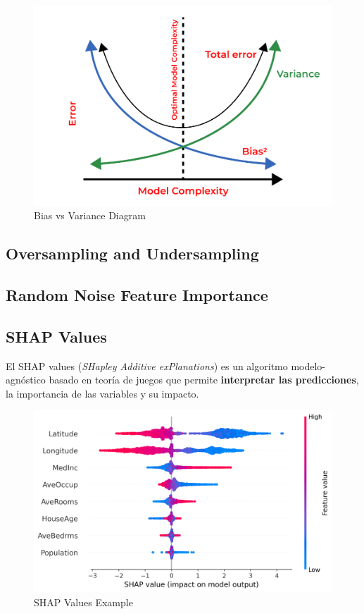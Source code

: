 \begin{figure}[H]
    \center
    \includegraphics[scale=0.3]{notebooks/Others/img/bias_vs_variance.png}
    \caption{Bias vs Variance Diagram}
\end{figure}

\subsection{Oversampling and Undersampling}

\subsection{Random Noise Feature Importance}

\subsection{SHAP Values}
\label{subsec:shap_values}

El SHAP values (\textit{SHapley Additive exPlanations}) es un algoritmo modelo-agnóstico basado en teoría de juegos que permite \textbf{interpretar las predicciones}, la importancia de las variables y su impacto.

\begin{figure}[H]
    \center
    \includegraphics[scale=0.55]{notebooks/Others/img/shap_values_example.png}
    \caption{SHAP Values Example}
\end{figure}

